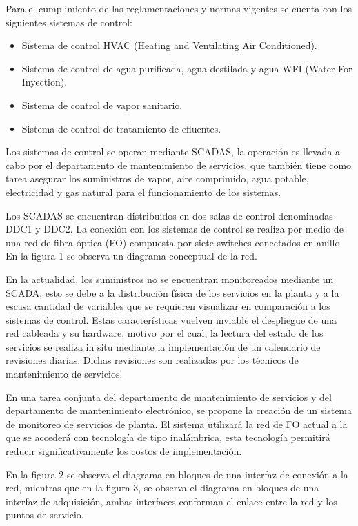 \documentclass[
11pt%
]{charter}
\begin{document}
Para el cumplimiento de las reglamentaciones y normas vigentes se cuenta con los siguientes sistemas de control:
\begin{itemize}
	\item Sistema de control HVAC (Heating and Ventilating Air Conditioned).
	\item Sistema de control de agua purificada, agua destilada y agua WFI (Water For Inyection).
	\item Sistema de control de vapor sanitario.
	\item Sistema de control de tratamiento de efluentes.
\end{itemize}

Los sistemas de control se operan mediante SCADAS, la operación es llevada a cabo por el departamento de mantenimiento de servicios, que también tiene como tarea asegurar los suministros de vapor, aire comprimido, agua potable, electricidad y gas natural para el funcionamiento de los sistemas.

Los SCADAS se encuentran distribuidos en dos salas de control denominadas DDC1 y DDC2. La conexión con los sistemas de control se realiza por medio de una red de fibra óptica (FO) compuesta por siete switches conectados en anillo. En la figura 1 se observa un diagrama conceptual de la red. 

En la actualidad, los suministros no se encuentran monitoreados mediante un SCADA, esto se debe a la distribución física de los servicios en la planta y a la escasa cantidad de variables que se requieren visualizar en comparación a los sistemas de control. Estas características vuelven inviable el despliegue de una red cableada y su hardware, motivo por el cual, la lectura del estado de los servicios se realiza in situ mediante la implementación de un calendario de revisiones diarias. Dichas revisiones son realizadas por los técnicos de mantenimiento de servicios.

En una tarea conjunta del departamento de mantenimiento de servicios y del departamento de mantenimiento electrónico, se propone la creación de un sistema de monitoreo de servicios de planta. El sistema utilizará la red de FO actual a la que se accederá con tecnología de tipo inalámbrica, esta tecnología permitirá reducir significativamente los costos de implementación.

En la figura 2 se observa el diagrama en bloques de una interfaz de conexión a la red, mientras que en la figura 3, se observa el diagrama en bloques de una interfaz de adquisición, ambas interfaces conforman el enlace entre la red y los puntos de servicio. 
\end{document}
